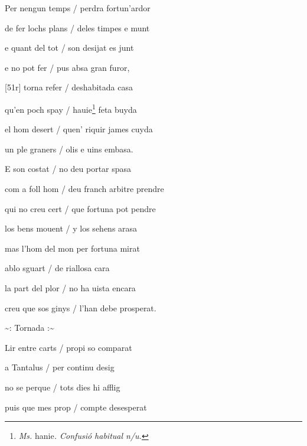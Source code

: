 \documentclass[12pt]{article}
\begin{document}
\begin{estrofa}

 Per nengun temps / perdra fortun'ardor

 de fer lochs plans / deles timpes e munt

 e quant del tot / son desijat es junt

 e no pot fer / pus absa gran furor,

 [51r] torna refer / deshabitada casa

 qu'en poch spay / hauie\footnote{\textit{Ms. }hanie\textit{. Confusi\'{o}
habitual n/u.}} feta buyda

 el hom desert / quen' riquir james cuyda

 un ple graners / olis e uins embasa.

\end{estrofa}



\begin{estrofa}

 E son costat / no deu portar spasa

 com a foll hom / deu franch arbitre prendre

 qui no creu cert / que fortuna pot pendre

 los bens mouent / y los sehens arasa

 mas l'hom del mon per fortuna mirat

 ablo sguart / de riallosa cara

 la part del plor / no ha uista encara

 creu que sos ginys / l'han debe prosperat.

\end{estrofa}


\begin{estrofaExtra}%




\begin{tornada}

\textasciitilde{}: Tornada
:\textasciitilde{}

\end{tornada}


\end{estrofaExtra}


\begin{estrofa}

 Lir entre carts / propi so comparat

 a Tantalus / per continu desig

 no se perque / tots dies hi afflig

 puis que mes prop / compte desesperat

\end{estrofa}
\end{document}
